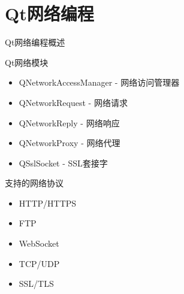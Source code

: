\documentclass[UTF8,aspectratio=169]{beamer}
\begin{document}
\section{Qt网络编程}

\begin{frame}{Qt网络编程概述}
    \begin{block}{Qt网络模块}
        \begin{itemize}
            \item QNetworkAccessManager - 网络访问管理器
            \item QNetworkRequest - 网络请求
            \item QNetworkReply - 网络响应
            \item QNetworkProxy - 网络代理
            \item QSslSocket - SSL套接字
        \end{itemize}
    \end{block}

    \begin{block}{支持的网络协议}
        \begin{itemize}
            \item HTTP/HTTPS
            \item FTP
            \item WebSocket
            \item TCP/UDP
            \item SSL/TLS
        \end{itemize}
    \end{block}
\end{frame}
\end{document}
